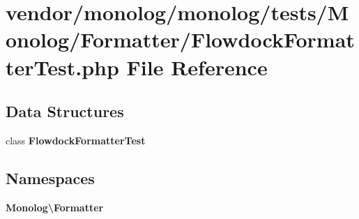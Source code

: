 \section{vendor/monolog/monolog/tests/\+Monolog/\+Formatter/\+Flowdock\+Formatter\+Test.php File Reference}
\label{_flowdock_formatter_test_8php}
\subsection*{Data Structures}
\begin{DoxyCompactItemize}
\item 
class {\bf Flowdock\+Formatter\+Test}
\end{DoxyCompactItemize}
\subsection*{Namespaces}
\begin{DoxyCompactItemize}
\item 
 {\bf Monolog\textbackslash{}\+Formatter}
\end{DoxyCompactItemize}
